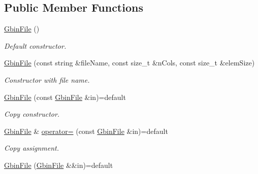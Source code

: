\subsection*{Public Member Functions}
\begin{DoxyCompactItemize}
\item 
\mbox{\label{classsamp_files_1_1_gbin_file_a43b61a06baecc13a76044a23d1fdd9e3}} 
\hyperlink{classsamp_files_1_1_gbin_file_a43b61a06baecc13a76044a23d1fdd9e3}{Gbin\+File} ()
\begin{DoxyCompactList}\small\item\em Default constructor. \end{DoxyCompactList}\item 
\hyperlink{classsamp_files_1_1_gbin_file_ac88b766b15e644506fa4bca84a650f3b}{Gbin\+File} (const string \&file\+Name, const size\+\_\+t \&n\+Cols, const size\+\_\+t \&elem\+Size)
\begin{DoxyCompactList}\small\item\em Constructor with file name. \end{DoxyCompactList}\item 
\mbox{\label{classsamp_files_1_1_gbin_file_aed811f6b8b264011420bba4d957ae50a}} 
\hyperlink{classsamp_files_1_1_gbin_file_aed811f6b8b264011420bba4d957ae50a}{Gbin\+File} (const \hyperlink{classsamp_files_1_1_gbin_file}{Gbin\+File} \&in)=default
\begin{DoxyCompactList}\small\item\em Copy constructor. \end{DoxyCompactList}\item 
\mbox{\label{classsamp_files_1_1_gbin_file_a5a09f00116fa5a8758e7c72f069ee232}} 
\hyperlink{classsamp_files_1_1_gbin_file}{Gbin\+File} \& \hyperlink{classsamp_files_1_1_gbin_file_a5a09f00116fa5a8758e7c72f069ee232}{operator=} (const \hyperlink{classsamp_files_1_1_gbin_file}{Gbin\+File} \&in)=default
\begin{DoxyCompactList}\small\item\em Copy assignment. \end{DoxyCompactList}\item 
\mbox{\label{classsamp_files_1_1_gbin_file_a406447ac7a681982a4d2e8d71b862f2b}} 
\hyperlink{classsamp_files_1_1_gbin_file_a406447ac7a681982a4d2e8d71b862f2b}{Gbin\+File} (\hyperlink{classsamp_files_1_1_gbin_file}{Gbin\+File} \&\&in)=default

\end{DoxyCompactItemize}
